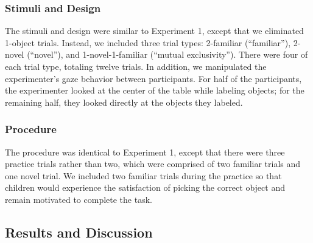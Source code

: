 \documentclass[10pt, letterpaper]{article}
\begin{document}
\subsubsection{Stimuli and Design}\label{stimuli-and-design-1}

The stimuli and design were similar to Experiment 1, except that we
eliminated 1-object trials. Instead, we included three trial types:
2-familiar (``familiar''), 2-novel (``novel''), and 1-novel-1-familiar
(``mutual exclusivity''). There were four of each trial type, totaling
twelve trials. In addition, we manipulated the experimenter's gaze
behavior between participants. For half of the participants, the
experimenter looked at the center of the table while labeling objects;
for the remaining half, they looked directly at the objects they
labeled.

\subsubsection{Procedure}\label{procedure-1}

The procedure was identical to Experiment 1, except that there were
three practice trials rather than two, which were comprised of two
familiar trials and one novel trial. We included two familiar trials
during the practice so that children would experience the satisfaction
of picking the correct object and remain motivated to complete the task.

\subsection{Results and Discussion}\label{results-and-discussion-1}
\end{document}
